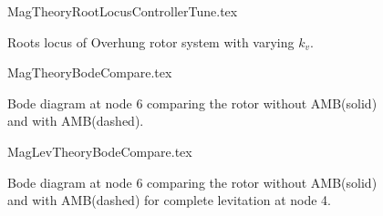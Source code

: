 \begin{figure}[!htb]
	\def\width{.7\linewidth}
	\def\height{.5\linewidth}
	\def\sep{3em}
	\centering
	{MagTheoryRootLocusControllerTune.tex}
	\caption{Roots locus of Overhung rotor system with varying $ k_v $.}
	\label{fig:MagTheoryRootLocusControllerTune}
\end{figure}
\begin{figure}[!htb]
	\def\width{.6\linewidth}
	\def\height{.4\linewidth}
	\def\sep{3em}
	\centering
	{MagTheoryBodeCompare.tex}
	\caption{Bode diagram at node 6 comparing the rotor without AMB(solid) and with AMB(dashed).}
	\label{fig:MagTheoryBodeCompare}
\end{figure}
\begin{figure}[!htb]
	\def\width{.6\linewidth}
	\def\height{.4\linewidth}
	\def\sep{3em}
	\centering
	{MagLevTheoryBodeCompare.tex}
	\caption{Bode diagram at node 6 comparing the rotor without AMB(solid) and with AMB(dashed) for complete levitation at node 4.}
	\label{fig:MagLevTheoryBodeCompare}
\end{figure}